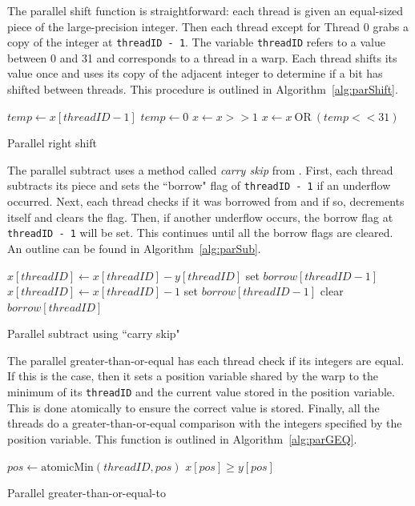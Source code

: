 \documentclass[12pt]{ucthesis}
\begin{document}
The parallel shift function is straightforward: each thread is given an 
equal-sized piece of the large-precision integer. Then each thread except for 
Thread 0 grabs a copy of the integer at \texttt{threadID  - 1}.
The variable \texttt{threadID} refers to a value between 0 and 31 and corresponds 
to a thread in a warp. Each thread shifts its value once and 
uses its copy of the adjacent integer to determine if a bit has shifted 
between threads. This procedure is outlined in Algorithm~\ref{alg:parShift}.
\begin{algorithm}
   \nl{} {
      \nl$temp\gets x[threadID - 1]$\;
   }{
      \nl$temp\gets 0$\;
   }
   \nl$x\gets x>>1$\;
   \nl$x\gets x \:\text{OR}\: (temp << 31)$\;
   \caption{Parallel right shift}
   \label{alg:parShift}
\end{algorithm}

The parallel subtract uses a method called \emph{carry skip} from 
\cite{fujimoto2009high}. First, each thread subtracts its piece and sets the 
``borrow" flag of \texttt{threadID - 1} if an underflow occurred. Next, each 
thread checks if it was borrowed from and if so, decrements itself and clears the 
flag. Then, if another underflow occurs, the borrow flag at
\texttt{threadID - 1} will be set. This continues until all the borrow flags
are cleared. An outline can be found in Algorithm~\ref{alg:parSub}.

\begin{algorithm}
   \nl$x[threadID]\gets x[threadID]-y[threadID]$\;
   \nl{} {
      \nl set $borrow[threadID - 1]$\;
   }
   \nl{} {
   \nl{} {
      \nl$x[threadID]\gets x[threadID] - 1$\;
         \nl{} {
            \nl set $borrow[threadID - 1]$\;
         }
         \nl clear $borrow[threadID]$\;
      }
   }
   \caption{Parallel subtract using ``carry skip"}
   \label{alg:parSub}
\end{algorithm}

The parallel greater-than-or-equal has each thread check if its integers are 
equal. If this is the case, then it sets a position variable shared by the warp 
to the minimum of its \texttt{threadID} and the current value stored in the position variable.
This is done atomically to ensure the correct value is stored. Finally, all 
the threads do a greater-than-or-equal comparison with the integers specified
by the position variable. This function is outlined in Algorithm~\ref{alg:parGEQ}.
\begin{algorithm}
   \nl{} {
      \nl$pos\gets \text{atomicMin}(threadID, pos)$\;
   }
   \nl\Return $x[pos] \geq y[pos]$
   \caption{Parallel greater-than-or-equal-to}
   \label{alg:parGEQ}
\end{algorithm}
\end{document}
